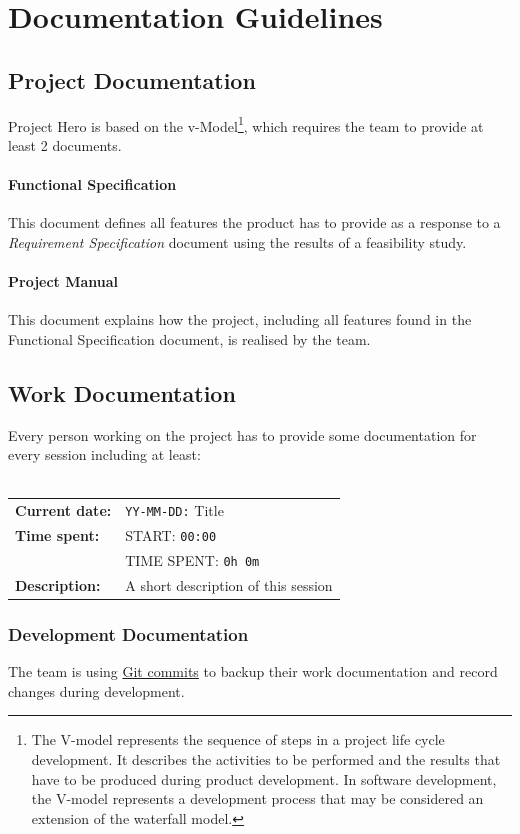 \documentclass[11pt]{article}
\begin{document}
\newpage

\section{Documentation Guidelines}
\subsection{Project Documentation}
Project Hero is based on the v-Model\footnote{The V-model represents the sequence of steps in a project life cycle development. It describes the activities to be performed and the results that have to be produced during product development. In software development, the V-model represents a development process that may be considered an extension of the waterfall model.}, which requires the team to provide at least 2 documents.
\paragraph{Functional Specification} This document defines all features the product has to provide as a response to a \textit{Requirement Specification} document using the results of a feasibility study.
\paragraph{Project Manual} This document explains how the project, including all features found in the Functional Specification document, is realised by the team.

\subsection{Work Documentation}
Every person working on the project has to provide some documentation for every session including at least:
\\
\\
\begin{tabular}{ll}
 \textbf{Current date:} & \texttt{YY-MM-DD:} Title\\
 \textbf{Time spent:} & START: \texttt{00:00}\\
 & TIME SPENT: \texttt{0h 0m}\\
 \textbf{Description:} & A short description of this session
\end{tabular}

\subsubsection{Development Documentation}
The team is using \hyperref[subsubsec:github]{Git commits} to backup their work documentation and record changes during development.
\end{document}
